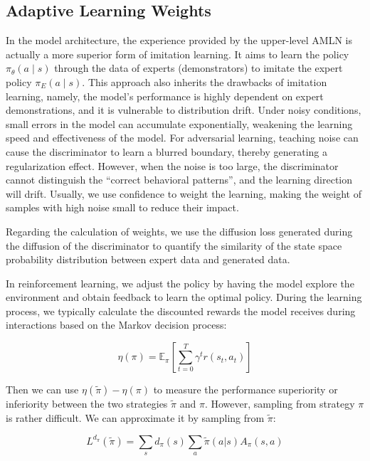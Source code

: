 \documentclass[lettersize,journal]{IEEEtran}
\begin{document}
\subsection{Adaptive Learning Weights}
In the model architecture, the experience provided by the upper-level AMLN is actually a more superior form of imitation learning. It aims to learn the policy $\pi_\theta\left(a\mid s\right)$ through the data of experts (demonstrators) to imitate the expert policy $\pi_E\left(a\mid s\right)$. This approach also inherits the drawbacks of imitation learning, namely, the model's performance is highly dependent on expert demonstrations, and it is vulnerable to distribution drift. Under noisy conditions, small errors in the model can accumulate exponentially, weakening the learning speed and effectiveness of the model. For adversarial learning, teaching noise can cause the discriminator to learn a blurred boundary, thereby generating a regularization effect. However, when the noise is too large, the discriminator cannot distinguish the ``correct behavioral patterns'', and the learning direction will drift. Usually, we use confidence to weight the learning, making the weight of samples with high noise small to reduce their impact.

Regarding the calculation of weights, we use the diffusion loss generated during the diffusion of the discriminator to quantify the similarity of the state space probability distribution between expert data and generated data.

In reinforcement learning, we adjust the policy by having the model explore the environment and obtain feedback to learn the optimal policy. During the learning process, we typically calculate the discounted rewards the model receives during interactions based on the Markov decision process:

\begin{equation}
\eta (\pi)=\mathbb{E}_{\pi} \left[ \sum_{t=0}^{T} \gamma^t r(s_t,a_t) \right]
\end{equation}

Then we can use $\eta\left(\widetilde{\pi}\right) - \eta\left(\pi\right)$ to measure the performance superiority or inferiority between the two strategies $\widetilde{\pi}$ and $\pi$. However, sampling from strategy $\pi$ is rather difficult. We can approximate it by sampling from $\widetilde{\pi}$:

\begin{equation}
  L^{d_{\pi}}(\widetilde{\pi})=\sum_{s} d_{\pi}(s) \sum_{a} \widetilde{\pi}(a|s) A_{\pi}(s,a)
\end{equation}
\end{document}
